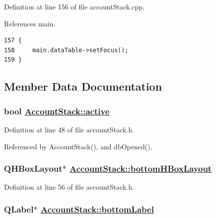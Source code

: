 Definition at line 156 of file account\-Stack.cpp.

References main.

\footnotesize\begin{verbatim}157 {
158     main.dataTable->setFocus();
159 }
\end{verbatim}\normalsize 




\subsection{Member Data Documentation}
\hypertarget{classAccountStack_r4}{
\subsubsection[active]{\setlength{\rightskip}{0pt plus 5cm}bool \hyperlink{classAccountStack_r4}{Account\-Stack::active}}}
\label{classAccountStack_r4}


Definition at line 48 of file account\-Stack.h.

Referenced by Account\-Stack(), and db\-Opened().\hypertarget{classAccountStack_r10}{
\subsubsection[bottomHBoxLayout]{\setlength{\rightskip}{0pt plus 5cm}QHBox\-Layout$\ast$ \hyperlink{classAccountStack_r10}{Account\-Stack::bottom\-HBox\-Layout}}}
\label{classAccountStack_r10}


Definition at line 56 of file account\-Stack.h.\hypertarget{classAccountStack_r11}{
\subsubsection[bottomLabel]{\setlength{\rightskip}{0pt plus 5cm}QLabel$\ast$ \hyperlink{classAccountStack_r11}{Account\-Stack::bottom\-Label}}}
\label{classAccountStack_r11}


